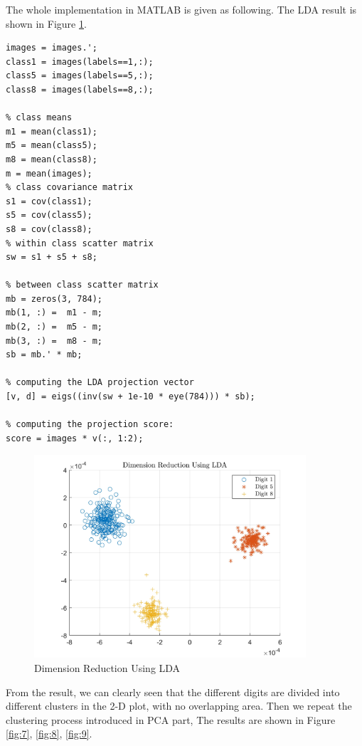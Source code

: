 \documentclass[a4paper,12pt]{article} %
\begin{document}
\hspace{0.7cm}
The whole implementation in MATLAB is given as following. The LDA result is shown in Figure \ref{fig:6}.
\begin{footnotesize}
\begin{verbatim}
images = images.';
class1 = images(labels==1,:);
class5 = images(labels==5,:);
class8 = images(labels==8,:);

% class means
m1 = mean(class1);
m5 = mean(class5);
m8 = mean(class8);
m = mean(images);
% class covariance matrix
s1 = cov(class1);
s5 = cov(class5);
s8 = cov(class8);
% within class scatter matrix
sw = s1 + s5 + s8;

% between class scatter matrix
mb = zeros(3, 784);
mb(1, :) =  m1 - m;
mb(2, :) =  m5 - m;
mb(3, :) =  m8 - m;
sb = mb.' * mb;

% computing the LDA projection vector
[v, d] = eigs((inv(sw + 1e-10 * eye(784))) * sb);

% computing the projection score:
score = images * v(:, 1:2);
\end{verbatim}
\end{footnotesize}

\begin{figure}[!htbp]
	\centering
	\includegraphics[width=0.9\textwidth]{LDA.jpg}
	\caption{Dimension Reduction Using LDA}
	\label{fig:6}
\end{figure}

\hspace{0.7cm}
From the result, we can clearly seen that the different digits are divided into different clusters in the 2-D plot, with no overlapping area. Then we repeat the clustering process introduced in PCA part, The results are shown in Figure \ref{fig:7}, \ref{fig:8}, \ref{fig:9}.
\end{document}
